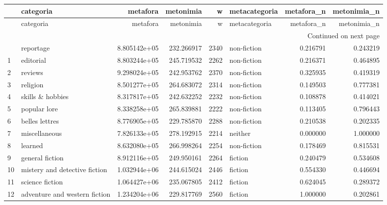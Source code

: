 \documentclass[11pt]{article}
\begin{document}
\begin{longtable}{llrrrlrr}
\toprule
{} &                      categoria &      metafora &   metonimia &     w & metacategoria &  metafora\_n &  metonimia\_n \\
\midrule
\endfirsthead

\toprule
{} &                      categoria &      metafora &   metonimia &     w & metacategoria &  metafora\_n &  metonimia\_n \\
\midrule
\endhead
\midrule
\multicolumn{8}{r}{{Continued on next page}} \\
\midrule
\endfoot
\bottomrule
\endlastfoot
0  &                      reportage &  8.805142e+05 &  232.266917 &  2340 &   non-fiction &    0.216791 &     0.243219 \\
1  &                      editorial &  8.803244e+05 &  245.719532 &  2262 &   non-fiction &    0.216371 &     0.464895 \\
2  &                        reviews &  9.298024e+05 &  242.953762 &  2370 &   non-fiction &    0.325935 &     0.419319 \\
3  &                       religion &  8.501277e+05 &  264.683072 &  2314 &   non-fiction &    0.149503 &     0.777381 \\
4  &               skills \& hobbies &  8.317817e+05 &  242.632252 &  2232 &   non-fiction &    0.108878 &     0.414021 \\
5  &                   popular lore &  8.338258e+05 &  265.839881 &  2222 &   non-fiction &    0.113405 &     0.796443 \\
6  &                 belles lettres &  8.776905e+05 &  229.785870 &  2288 &   non-fiction &    0.210538 &     0.202335 \\
7  &                  miscellaneous &  7.826133e+05 &  278.192915 &  2214 &       neither &    0.000000 &     1.000000 \\
8  &                        learned &  8.632080e+05 &  266.998264 &  2254 &   non-fiction &    0.178469 &     0.815531 \\
9  &                general fiction &  8.912116e+05 &  249.950161 &  2264 &       fiction &    0.240479 &     0.534608 \\
10 &  mistery and detective fiction &  1.032944e+06 &  244.615024 &  2446 &       fiction &    0.554330 &     0.446694 \\
11 &                science fiction &  1.064427e+06 &  235.067805 &  2412 &       fiction &    0.624045 &     0.289372 \\
12 &  adventure and western fiction &  1.234204e+06 &  229.817769 &  2560 &       fiction &    1.000000 &     0.202861 \\

\end{longtable}
\end{document}
